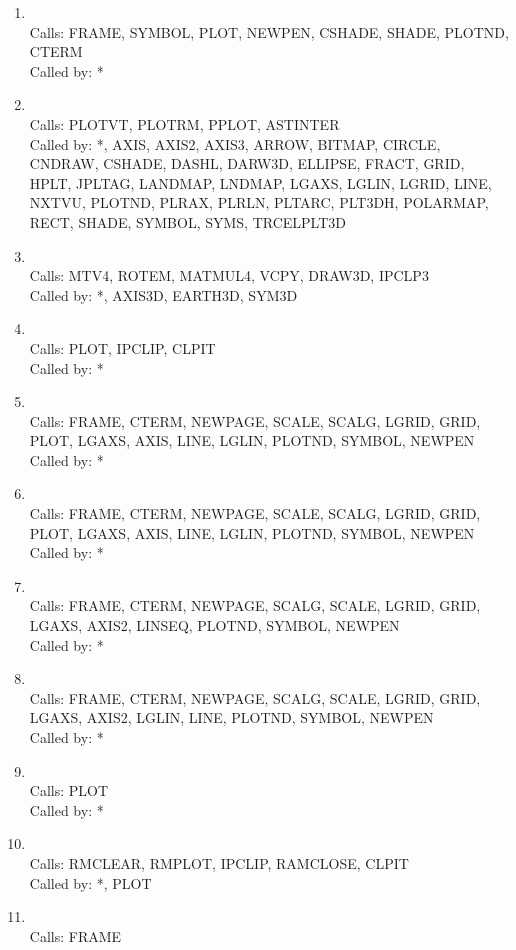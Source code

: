 \documentclass[11pt]{report}
\begin{document}
\begin{enumerate}
\item {}
\\ Calls:  FRAME, SYMBOL, PLOT, NEWPEN, CSHADE, SHADE, PLOTND, CTERM
\\ Called by: *
\item {}
\\ Calls:  PLOTVT, PLOTRM, PPLOT, ASTINTER
\\ Called by: *, AXIS, AXIS2, AXIS3, ARROW, BITMAP, CIRCLE, CNDRAW, CSHADE,
DASHL, DARW3D, ELLIPSE,  FRACT, GRID, HPLT, JPLTAG, LANDMAP, LNDMAP, LGAXS,
LGLIN, LGRID, LINE, NXTVU, PLOTND, PLRAX, PLRLN, PLTARC, PLT3DH, POLARMAP,
RECT, SHADE, SYMBOL, SYMS, TRCELPLT3D
\item {}
\\ Calls:  MTV4, ROTEM, MATMUL4, VCPY, DRAW3D, IPCLP3
\\ Called by: *, AXIS3D, EARTH3D, SYM3D
\item {}
\\ Calls: PLOT, IPCLIP, CLPIT
\\ Called by: *
\item {}
\\ Calls:  FRAME, CTERM, NEWPAGE, SCALE, SCALG, LGRID, GRID, PLOT, 
LGAXS, AXIS, LINE, LGLIN, PLOTND, SYMBOL, NEWPEN
\\ Called by: *
\item {}
\\ Calls:  FRAME, CTERM, NEWPAGE, SCALE, SCALG, LGRID, GRID, PLOT, 
LGAXS, AXIS, LINE, LGLIN, PLOTND, SYMBOL, NEWPEN
\\ Called by: *
\item {}
\\ Calls:  FRAME, CTERM, NEWPAGE, SCALG, SCALE, LGRID, GRID, 
LGAXS, AXIS2, LINSEQ, PLOTND, SYMBOL, NEWPEN
\\ Called by: *
\item {}
\\ Calls:  FRAME, CTERM, NEWPAGE, SCALG, SCALE, LGRID, GRID, 
LGAXS, AXIS2, LGLIN, LINE, PLOTND, SYMBOL, NEWPEN
\\ Called by: *
\item {}
\\ Calls:  PLOT
\\ Called by: *
\item {}
\\ Calls:  RMCLEAR, RMPLOT, IPCLIP, RAMCLOSE, CLPIT
\\ Called by: *, PLOT
\item {}
\\ Calls:  FRAME

\end{enumerate}
\end{document}
